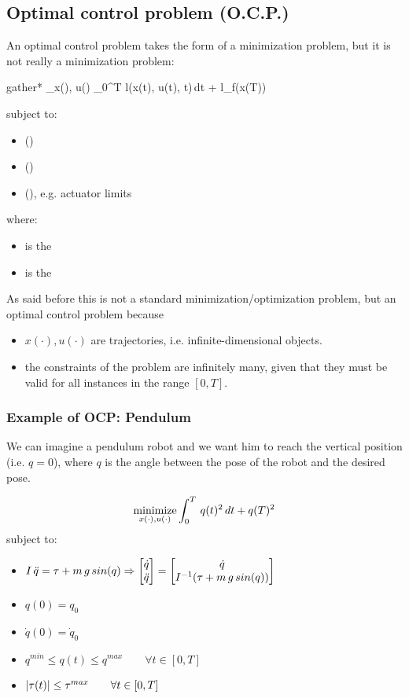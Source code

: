 \subsection{Optimal control problem (O.C.P.)}

An optimal control problem takes the form of a minimization problem, but it is not really a minimization problem:
\begin{empheq}[box=%
	\fbox]{gather*}
\minimize_{x(\cdot), u(\cdot)} \int_0^T l(x(t), u(t), t)\,dt + l_f(x(T))
	\end{empheq}
subject to:
\begin{itemize}
\item{} ()
\item{ }()
\item{} (), e.g. actuator limits
\end{itemize}
where:
\begin{itemize}
\item{ is the }
\item{ is the }
\end{itemize}

As said before this is not a standard minimization/optimization problem, but an optimal control problem because
\begin{itemize}
\item $x(\cdot), u(\cdot)$ are trajectories, i.e. infinite-dimensional objects.
\item the constraints of the problem are infinitely many, given that they must be valid for all instances in the range $[0, T]$.
\end{itemize}

\subsubsection{Example of OCP: Pendulum}
We can imagine a pendulum robot and we want him to reach the vertical position (i.e. $q = 0$), where $q$ is the angle between the pose of the robot and the desired pose.

\[\operatorname*{minimize}_{x(\cdot), u(\cdot)} \int_0^T\,q(t)^2\,dt + q(T)^2\]
subject to:
\begin{itemize}
\item $I\,\ddot{q} = \tau + m\,g\,sin(q) \Rightarrow \begin{bmatrix}\dot{q}\\\ddot{q}\end{bmatrix} = \begin{bmatrix}\dot{q}\\I^{-1}(\tau + m\,g\,sin(q))\end{bmatrix}$
\item $q(0) = q_0$
\item $\dot{q}(0) = \dot{q}_0$
\item $q^{min} \le q(t) \le q^{max}\qquad\forall t \in [0,T]$
\item $\lvert\tau(t)\rvert \le \tau^{max}\qquad \forall t \in [0,T]$
\end{itemize}

